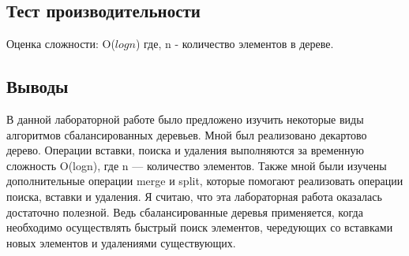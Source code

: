 \documentclass[12pt]{article}
\begin{document}
\subsection*{Тест производительности}


Оценка сложности: O($logn$) где, n - количество элементов в дереве.

\subsection*{Выводы}

В данной лабораторной работе было предложено изучить некоторые виды алгоритмов
сбалансированных деревьев. Мной был реализовано декартово дерево. Операции
вставки, поиска и удаления выполняются за временную сложность O(logn), где n —
количество элементов. Также мной были изучены дополнительные операции merge и
split, которые помогают реализовать операции поиска, вставки и удаления.
Я считаю, что эта лабораторная работа оказалась достаточно полезной. Ведь
сбалансированные деревья применяется, когда необходимо осуществлять быстрый поиск
элементов, чередующих со вставками новых элементов и удалениями существующих.
\end{document}
